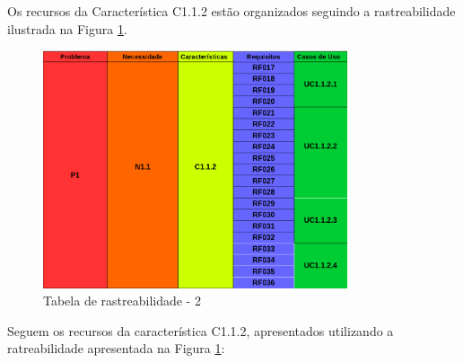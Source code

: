 	Os recursos da Característica C1.1.2 estão organizados seguindo a rastreabilidade ilustrada na Figura \ref{img:tabelaParte2}.

\begin{figure}[H]
	\centering
	\includegraphics[width=0.8\textwidth]{imgModelagem/tabelaParte2}
	\caption{Tabela de rastreabilidade - 2 }
	\label{img:tabelaParte2}
\end{figure}

	Seguem os recursos da característica C1.1.2, apresentados utilizando a ratreabilidade apresentada na Figura \ref{img:tabelaParte2}:

